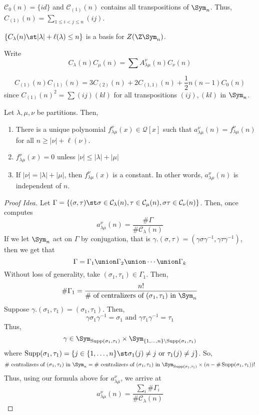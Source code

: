 \documentclass[11pt,leqno,oneside]{amsbook}
\renewcommand{\Q}{\mathcal{Q}}
\newcommand{\CC}{\mathcal{C}} %
\DeclareMathOperator{\Supp}{Supp}
\numberwithin{thm}{section}
\begin{document}
\begin{example}
  \(\CC_0(n) = \{id\}\) and \(\CC_{(1)}(n)\) contains all transpositions
  of \(\Sym_n\). Thus, \(C_{(1)}(n) = \sum_{1 \leq i < j \leq n} (ij)\).
\end{example}
\begin{prop}
  \(\{C_\lambda(n) \st |\lambda|+\ell(\lambda) \leq n\}\) is a basis
  for \(Z(\Z \Sym_n)\). 
\end{prop}
\begin{defn}
  Write \[
    C_\lambda(n) C_\mu(n) = \sum A_{\lambda \mu}^\nu(n) C_\nu(n)
  \]
\end{defn}
\begin{example}
  \[
    C_{(1)}(n) C_{(1)}(n) = 3 C_{(2)}(n) + 2 C_{(1,1)}(n) +
    \frac{1}{2}n(n-1) C_0(n)
  \]
  since \(C_{(1)}(n)^2 = \sum (ij)(kl)\) for all transpositions
  \((ij),(kl)\) in \(\Sym_n\).
\end{example}
\begin{thm}
  Let \(\lambda,\mu,\nu\) be partitions. Then,
  \begin{enumerate}
  \item There is a unique polynomial \(f_{\lambda \mu}^\nu(x) \in
    \Q[x]\) such that \(a_{\lambda \mu}^\nu(n) = f_{\lambda
      \mu}^\nu(n)\) for all \(n \geq |\nu|+\ell(\nu)\).
  \item \(f_{\lambda \mu}^\nu(x) = 0\) unless \(|\nu| \leq
    |\lambda|+|\mu|\)
  \item If \(|\nu| = |\lambda|+|\mu|\), then \(f_{\lambda
      \mu}^\nu(x)\) is a constant. In other words, \(a_{\lambda
      \mu}^\nu(n)\) is independent of \(n\).
  \end{enumerate}
\end{thm}
\begin{proof}[Proof Idea]
  Let \(\Gamma = \{(\sigma,\tau) \st \sigma \in \CC_\lambda(n), \tau
  \in \CC_\mu(n), \sigma \tau \in \CC_\nu(n)\}\). Then, once
  computes \[
    a_{\lambda \mu}^\nu(n) = \frac{\# \Gamma}{\# \CC_\lambda(n)}
  \]
  If we let \(\Sym_n\) act on \(\Gamma\) by conjugation, that is
  \(\gamma.(\sigma,\tau) = (\gamma \sigma \gamma^{-1}, \gamma \tau
  \gamma^{-1})\), then we get that \[
    \Gamma = \Gamma_1 \union \Gamma_2 \union \cdots \union \Gamma_k
  \]
  Without loss of generality, take \((\sigma_1, \tau_1) \in
  \Gamma_1\). Then, \[
    \# \Gamma_1 = \frac{n!}{\#\text{ of centralizers of
      }(\sigma_1,\tau_1)\text{ in }\Sym_n}
  \]
  Suppose \(\gamma.(\sigma_1,\tau_1) = (\sigma_1,\tau_1)\). Then, \[
    \gamma \sigma_1 \gamma^{-1} = \sigma_1 \text{ and } \gamma \tau_1
    \gamma^{-1} = \tau_1
  \]
  Thus, \[
    \gamma \in \Sym_{\Supp(\sigma_1,\tau_1)} \times
    \Sym_{\{1,\ldots,n\} \setminus \Supp(\sigma_1, \tau_1)}
  \]
  where \(\Supp(\sigma_1,\tau_1) = \{j \in \{1,\ldots,n\} \st
  \sigma_1(j) \neq j \text{ or }\tau_1(j) \neq j\}\). So, \[
    \# \text{ centralizers of }(\sigma_1, \tau_1)\text{ in }\Sym_n =
    \# \text{ centralizers of }(\sigma_1, \tau_1)\text{ in
    }\Sym_{\Supp(\sigma_1,\tau_1)} \times (n - \# \Supp(\sigma_1,\tau_1))!
  \]
  Thus, using our formula above for \(a_{\lambda \mu}^\nu\), we arrive
  at \[
    a_{\lambda \mu}^\nu(n) = \frac{\sum_i \# \Gamma_i}{\#
      \CC_\lambda(n)}
  \]
\end{proof}
\end{document}
